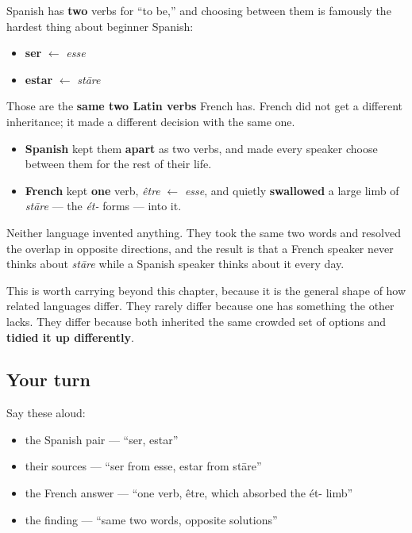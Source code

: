 \begin{culture}
Spanish has \textbf{two} verbs for \textquotedblleft{}to be,\textquotedblright{} and choosing between them is famously the hardest thing about beginner Spanish:

\begin{itemize}
\raggedright
  \item \textbf{ser} $\leftarrow$ \emph{esse}
  \item \textbf{estar} $\leftarrow$ \emph{stāre}
\end{itemize}

Those are the \textbf{same two Latin verbs} French has. French did not get a different inheritance; it made a different decision with the same one.

\begin{itemize}
\raggedright
  \item \textbf{Spanish} kept them \textbf{apart} as two verbs, and made every speaker choose between them for the rest of their life.
  \item \textbf{French} kept \textbf{one} verb, \emph{être} $\leftarrow$ \emph{esse}, and quietly \textbf{swallowed} a large limb of \emph{stāre} — the \emph{ét-} forms — into it.
\end{itemize}

Neither language invented anything. They took the same two words and resolved the overlap in opposite directions, and the result is that a French speaker never thinks about \emph{stāre} while a Spanish speaker thinks about it every day.

This is worth carrying beyond this chapter, because it is the general shape of how related languages differ. They rarely differ because one has something the other lacks. They differ because both inherited the same crowded set of options and \textbf{tidied it up differently}.
\end{culture}

\subsection*{Your turn}
Say these aloud:

\begin{itemize}
\raggedright
  \item the Spanish pair — \textquotedblleft{}ser, estar\textquotedblright{}
  \item their sources — \textquotedblleft{}ser from esse, estar from stāre\textquotedblright{}
  \item the French answer — \textquotedblleft{}one verb, être, which absorbed the ét- limb\textquotedblright{}
  \item the finding — \textquotedblleft{}same two words, opposite solutions\textquotedblright{}
\end{itemize}

